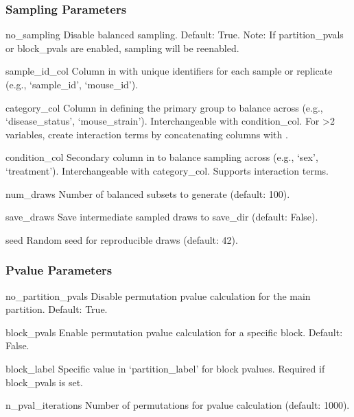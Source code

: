 \documentclass[letterpaper,10pt,english]{sphinxmanual}
\begin{document}
\subsubsection{Sampling Parameters}
\label{\detokenize{cli:sampling-parameters}}\begin{optionlist}{3cm}
\item [\sphinxhyphen{}\sphinxhyphen{}no\_sampling]  
\sphinxAtStartPar
Disable balanced sampling. Default: True. Note: If partition\_pvals or block\_pvals are enabled, sampling will be re\sphinxhyphen{}enabled.
\item [\sphinxhyphen{}\sphinxhyphen{}sample\_id\_col]  
\sphinxAtStartPar
Column in  with unique identifiers for each sample or replicate (e.g., ‘sample\_id’, ‘mouse\_id’).
\item [\sphinxhyphen{}\sphinxhyphen{}category\_col]  
\sphinxAtStartPar
Column in  defining the primary group to balance across (e.g., ‘disease\_status’, ‘mouse\_strain’). Interchangeable with condition\_col. For \textgreater{}2 variables, create interaction terms by concatenating columns with \sphinxtitleref{:}.
\item [\sphinxhyphen{}\sphinxhyphen{}condition\_col]  
\sphinxAtStartPar
Secondary column in  to balance sampling across (e.g., ‘sex’, ‘treatment’). Interchangeable with category\_col. Supports interaction terms.
\item [\sphinxhyphen{}\sphinxhyphen{}num\_draws]  
\sphinxAtStartPar
Number of balanced subsets to generate (default: 100).
\item [\sphinxhyphen{}\sphinxhyphen{}save\_draws]  
\sphinxAtStartPar
Save intermediate sampled draws to save\_dir (default: False).
\item [\sphinxhyphen{}\sphinxhyphen{}seed]  
\sphinxAtStartPar
Random seed for reproducible draws (default: 42).
\end{optionlist}


\subsubsection{P\sphinxhyphen{}value Parameters}
\label{\detokenize{cli:p-value-parameters}}\begin{optionlist}{3cm}
\item [\sphinxhyphen{}\sphinxhyphen{}no\_partition\_pvals]  
\sphinxAtStartPar
Disable permutation p\sphinxhyphen{}value calculation for the main partition. Default: True.
\item [\sphinxhyphen{}\sphinxhyphen{}block\_pvals]  
\sphinxAtStartPar
Enable permutation p\sphinxhyphen{}value calculation for a specific block. Default: False.
\item [\sphinxhyphen{}\sphinxhyphen{}block\_label]  
\sphinxAtStartPar
Specific value in ‘partition\_label’ for block p\sphinxhyphen{}values. Required if \textendash{}block\_pvals is set.
\item [\sphinxhyphen{}\sphinxhyphen{}n\_pval\_iterations]  
\sphinxAtStartPar
Number of permutations for p\sphinxhyphen{}value calculation (default: 1000).
\end{optionlist}
\end{document}
